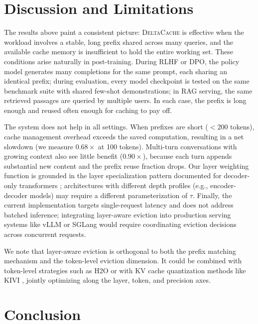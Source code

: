 \documentclass{article}
\newcommand{\deltacache}{\textsc{DeltaCache}}
\begin{document}
\section{Discussion and Limitations}

The results above paint a consistent picture: \deltacache{} is effective when the workload involves a stable, long prefix shared across many queries, and the available cache memory is insufficient to hold the entire working set. These conditions arise naturally in post-training. During RLHF or DPO, the policy model generates many completions for the same prompt, each sharing an identical prefix; during evaluation, every model checkpoint is tested on the same benchmark suite with shared few-shot demonstrations; in RAG serving, the same retrieved passages are queried by multiple users. In each case, the prefix is long enough and reused often enough for caching to pay off.

The system does not help in all settings. When prefixes are short ($<$200 tokens), cache management overhead exceeds the saved computation, resulting in a net slowdown (we measure $0.68\times$ at 100 tokens). Multi-turn conversations with growing context also see little benefit ($0.90\times$), because each turn appends substantial new content and the prefix reuse fraction drops. Our layer weighting function is grounded in the layer specialization pattern documented for decoder-only transformers \citep{rogers2020primer}; architectures with different depth profiles (e.g., encoder-decoder models) may require a different parameterization of $\tau$. Finally, the current implementation targets single-request latency and does not address batched inference; integrating layer-aware eviction into production serving systems like vLLM \citep{kwon2023efficient} or SGLang \citep{zheng2023efficiently} would require coordinating eviction decisions across concurrent requests.

We note that layer-aware eviction is orthogonal to both the prefix matching mechanism and the token-level eviction dimension. It could be combined with token-level strategies such as H2O \citep{zhang2024h2o} or with KV cache quantization methods like KIVI \citep{liu2024kivi}, jointly optimizing along the layer, token, and precision axes.

\section{Conclusion}
\end{document}

